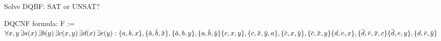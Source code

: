 \documentclass[xcolor=table	]{beamer}
\newcommand{\ov}[1]{\mkern 1.5mu\overline{\mkern-1.5mu#1\mkern-1.5mu}\mkern 1.5mu}
\begin{document}
\begin{frame}{Solve DQBF: SAT or UNSAT?}


	\begin{alertblock}{DQCNF formula:}
	{		
		F :=	$ \forall x, y \, \exists a(x) \, \exists  b(y) \, \exists c(x,y) \, \exists d(x) \, \exists e(y) :
		\{a,b,x\}, \{\ov{a},\ov{b},\ov{x}\}, \{\ov{a},b,y\}, \{a,\ov{b},\ov{y}\}  \newline 
		\{c,x,y\}, \{c,\ov{x},\ov{y}, a\}, \{\ov{c},x,\ov{y}\}, \{\ov{c},\ov{x},y\} \newline 
		\{d,e,x\}, \{\ov{d},\ov{e},\ov{x}, c\} \{\ov{d},e,y\}, \{d,\ov{e},\ov{y}\} $
	}
\end{alertblock}

%
%

\end{frame}
\end{document}
